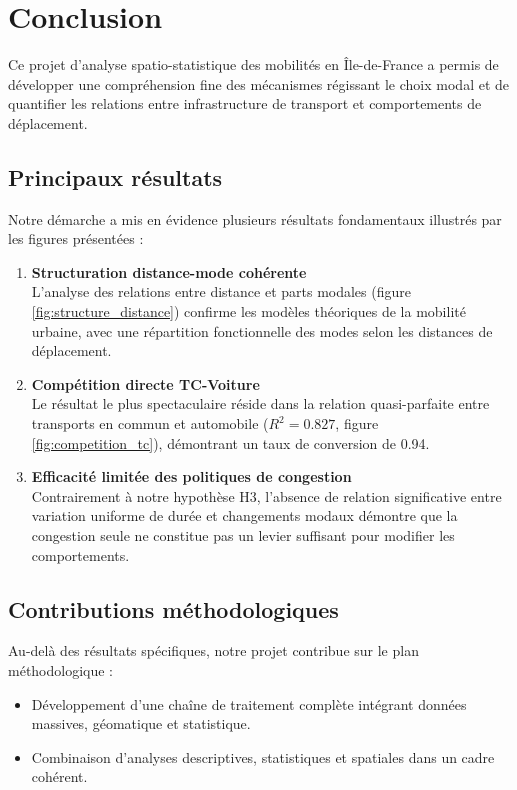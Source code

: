 \documentclass[11pt,a4paper]{article}
\begin{document}
\section{Conclusion}
Ce projet d'analyse spatio-statistique des mobilités en Île-de-France a permis de développer une compréhension fine des mécanismes régissant le choix modal et de quantifier les relations entre infrastructure de transport et comportements de déplacement.
\subsection{Principaux résultats}
Notre démarche a mis en évidence plusieurs résultats fondamentaux illustrés par les figures présentées :
\begin{enumerate}[label=\textbf{\arabic*.}]
    \item \textbf{Structuration distance-mode cohérente}\\
    L'analyse des relations entre distance et parts modales (figure \ref{fig:structure_distance}) confirme les modèles théoriques de la mobilité urbaine, avec une répartition fonctionnelle des modes selon les distances de déplacement.
    \item \textbf{Compétition directe TC-Voiture}\\
    Le résultat le plus spectaculaire réside dans la relation quasi-parfaite entre transports en commun et automobile ($R^2 = 0.827$, figure \ref{fig:competition_tc}), démontrant un taux de conversion de 0.94.
    \item \textbf{Efficacité limitée des politiques de congestion}\\
    Contrairement à notre hypothèse H3, l'absence de relation significative entre variation uniforme de durée et changements modaux démontre que la congestion seule ne constitue pas un levier suffisant pour modifier les comportements.
\end{enumerate}
\subsection{Contributions méthodologiques}
Au-delà des résultats spécifiques, notre projet contribue sur le plan méthodologique :
\begin{itemize}[label=\textbullet]
    \item Développement d'une chaîne de traitement complète intégrant données massives, géomatique et statistique.
    \item Combinaison d'analyses descriptives, statistiques et spatiales dans un cadre cohérent.
\end{itemize}
\end{document}

